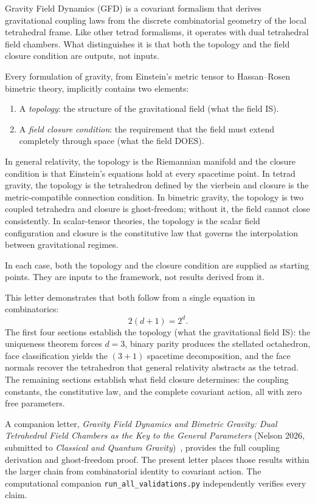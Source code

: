\documentclass[twocolumn]{iopjournal}
\begin{document}
Gravity Field Dynamics (GFD) is a covariant formalism that derives gravitational coupling laws from the discrete combinatorial geometry of the local tetrahedral frame. Like other tetrad formalisms, it operates with dual tetrahedral field chambers. What distinguishes it is that both the topology and the field closure condition are outputs, not inputs.

Every formulation of gravity, from Einstein's metric tensor to Hassan--Rosen bimetric theory, implicitly contains two elements:
\begin{enumerate}
\item A \emph{topology}: the structure of the gravitational field (what the field IS).
\item A \emph{field closure condition}: the requirement that the field must extend completely through space (what the field DOES).
\end{enumerate}

In general relativity, the topology is the Riemannian manifold and the closure condition is that Einstein's equations hold at every spacetime point. In tetrad gravity, the topology is the tetrahedron defined by the vierbein and closure is the metric-compatible connection condition. In bimetric gravity, the topology is two coupled tetrahedra and closure is ghost-freedom; without it, the field cannot close consistently. In scalar-tensor theories, the topology is the scalar field configuration and closure is the constitutive law that governs the interpolation between gravitational regimes.

In each case, both the topology and the closure condition are supplied as starting points. They are inputs to the framework, not results derived from it.

This letter demonstrates that both follow from a single equation in combinatorics:
\begin{equation}
2(d+1) = 2^d.
\end{equation}
The first four sections establish the topology (what the gravitational field IS): the uniqueness theorem forces $d = 3$, binary parity produces the stellated octahedron, face classification yields the $(3+1)$ spacetime decomposition, and the face normals recover the tetrahedron that general relativity abstracts as the tetrad. The remaining sections establish what field closure determines: the coupling constants, the constitutive law, and the complete covariant action, all with zero free parameters.

A companion letter, \emph{Gravity Field Dynamics and Bimetric Gravity: Dual Tetrahedral Field Chambers as the Key to the General Parameters} (Nelson 2026, submitted to \emph{Classical and Quantum Gravity})~\cite{Nelson2026b}, provides the full coupling derivation and ghost-freedom proof. The present letter places those results within the larger chain from combinatorial identity to covariant action. The computational companion \texttt{run\_all\_validations.py} independently verifies every claim.
\end{document}
